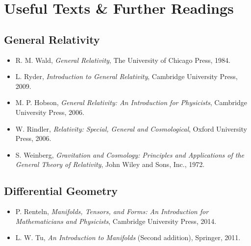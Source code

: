 \chapter*{Useful Texts \& Further Readings}

\section*{General Relativity}
\begin{itemize}
    \item R. M. Wald, \textit{General Relativity}, The University of Chicago Press, 1984.
    \item L. Ryder, \textit{Introduction to General Relativity}, Cambridge University Press, 2009.
    \item M. P. Hobson, \textit{General Relativity: An Introduction for Physicists}, Cambridge University Press, 2006.
    \item W. Rindler, \textit{Relativity: Special, General and Cosmological}, Oxford University Press, 2006. 
    \item S. Weinberg, \textit{Gravitation and Cosmology: Principles and Applications of the General Theory of Relativity}, John Wiley and Sons, Inc., 1972.
\end{itemize}

\section*{Differential Geometry}
\begin{itemize}
    \item P. Renteln, \textit{Manifolds, Tensors, and Forms: An Introduction for Mathematicians and Physicists}, Cambridge University Press, 2014.
    \item L. W. Tu, \textit{An Introduction to Manifolds} (Second addition), Springer, 2011.
\end{itemize}